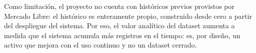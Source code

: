 Como limitación, el proyecto no cuenta con históricos previos provistos por Mercado Libre: el histórico es enteramente propio, construido desde cero a partir del despliegue del sistema. Por eso, el valor analítico del dataset aumenta a medida que el sistema acumula más registros en el tiempo: es, por diseño, un activo que mejora con el uso continuo y no un dataset cerrado.
